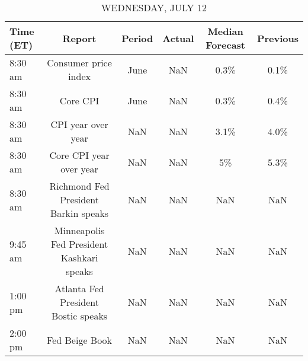 \documentclass{article}%
\begin{document}
\begin{table}[htbp]%
\caption{WEDNESDAY, JULY 12}%
\centering%
\begin{adjustbox}{width=1\textwidth}%
\begin{tabular}{lccccc}
\toprule
Time (ET) &                                    Report & Period & Actual & Median Forecast & Previous \\
\midrule
  8:30 am &                      Consumer price index &   June &    NaN &            0.3\% &     0.1\% \\
  8:30 am &                                  Core CPI &   June &    NaN &            0.3\% &     0.4\% \\
  8:30 am &                        CPI year over year &    NaN &    NaN &            3.1\% &     4.0\% \\
  8:30 am &                   Core CPI year over year &    NaN &    NaN &              5\% &     5.3\% \\
  8:30 am &      Richmond Fed President Barkin speaks &    NaN &    NaN &             NaN &      NaN \\
  9:45 am & Minneapolis Fed President Kashkari speaks &    NaN &    NaN &             NaN &      NaN \\
  1:00 pm &       Atlanta Fed President Bostic speaks &    NaN &    NaN &             NaN &      NaN \\
  2:00 pm &                            Fed Beige Book &    NaN &    NaN &             NaN &      NaN \\
\bottomrule
\end{tabular}
%
\end{adjustbox}%
\end{table}

%
\end{document}
